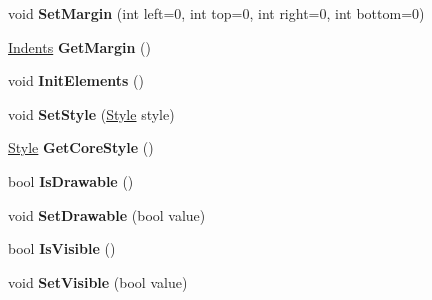 \begin{DoxyCompactItemize}
void {\bfseries Set\+Margin} (int left=0, int top=0, int right=0, int bottom=0)
\item 
\mbox{\label{interface_space_v_i_l_1_1_core_1_1_i_base_item_abde9c5bc900bbdf10f6a388db7e49538}} 
\mbox{\hyperlink{struct_space_v_i_l_1_1_decorations_1_1_indents}{Indents}} {\bfseries Get\+Margin} ()
\item 
\mbox{\label{interface_space_v_i_l_1_1_core_1_1_i_base_item_a6befa091a8c281ecb0a9f4a828811dd5}} 
void {\bfseries Init\+Elements} ()
\item 
\mbox{\label{interface_space_v_i_l_1_1_core_1_1_i_base_item_a677464b9dad4f9d67fb642d0196006fe}} 
void {\bfseries Set\+Style} (\mbox{\hyperlink{class_space_v_i_l_1_1_decorations_1_1_style}{Style}} style)
\item 
\mbox{\label{interface_space_v_i_l_1_1_core_1_1_i_base_item_ab25ce1ffaaa88dc31cf091c53e75f251}} 
\mbox{\hyperlink{class_space_v_i_l_1_1_decorations_1_1_style}{Style}} {\bfseries Get\+Core\+Style} ()
\item 
\mbox{\label{interface_space_v_i_l_1_1_core_1_1_i_base_item_ae0bd3a5916b47ae2813f9c857eae9af1}} 
bool {\bfseries Is\+Drawable} ()
\item 
\mbox{\label{interface_space_v_i_l_1_1_core_1_1_i_base_item_a6196b093e257a190fbf9a798887d776b}} 
void {\bfseries Set\+Drawable} (bool value)
\item 
\mbox{\label{interface_space_v_i_l_1_1_core_1_1_i_base_item_af879e50ebf2e7a213c31024616b7bff8}} 
bool {\bfseries Is\+Visible} ()
\item 
\mbox{\label{interface_space_v_i_l_1_1_core_1_1_i_base_item_a62e7a7edef2b465046083b57dcf1210c}} 
void {\bfseries Set\+Visible} (bool value)
\item 
\mbox{\label{interface_space_v_i_l_1_1_core_1_1_i_base_item_aa639cd1bb96b4146c1f92ed5c25aa5c5}} 

\end{DoxyCompactItemize}
